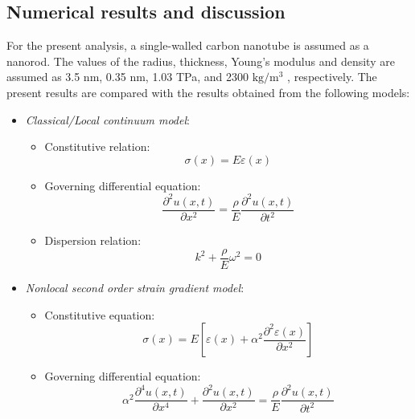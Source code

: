 \subsection{Numerical results and discussion}
For the present analysis, a single-walled carbon nanotube is
assumed as a nanorod. The values of the radius, thickness, Young’s
modulus and density are assumed as 3.5 nm, 0.35 nm, 1.03 TPa,
and 2300 $\mathrm{kg/m^3}$ , respectively.
The present results are compared with the results obtained from
the following models:\\
\begin{itemize}
\item \textit{Classical/Local continuum model}:
	\begin{itemize}
	\item Constitutive relation:\\
		\begin{equation}
		\sigma(x) = E \varepsilon(x)
		\end{equation}
	\item Governing differential equation:\\
		\begin{equation}
			\dfrac{\partial^2 u(x,t)}{\partial x^2} = \dfrac{\rho}{E} 					\dfrac{\partial^2 u(x,t)}{\partial t^2}
		\end{equation}
	\item Dispersion relation:\\
		\begin{equation}
			k^2 + \dfrac{\rho}{E} \omega^2 = 0
		\end{equation}
	\end{itemize}
\item \textit{Nonlocal second order strain gradient model}:\\
	\begin{itemize}
	\item Constitutive equation:\\
	\begin{equation}
		\sigma(x) = E \left[ \varepsilon(x) + \alpha^2 \dfrac{\partial^2 \varepsilon(x)}		{\partial x^2} \right]
	\end{equation}
	\item Governing differential equation:\\
	\begin{equation}
	\alpha^2 \dfrac{\partial^4 u(x,t)}{\partial x^4} + \dfrac{\partial^2 u(x,t)}{\partial x^2} = \dfrac{\rho}{E} \dfrac{\partial^2 u(x,t)}{\partial t^2}
	\end{equation}

\end{itemize}
\end{itemize}
